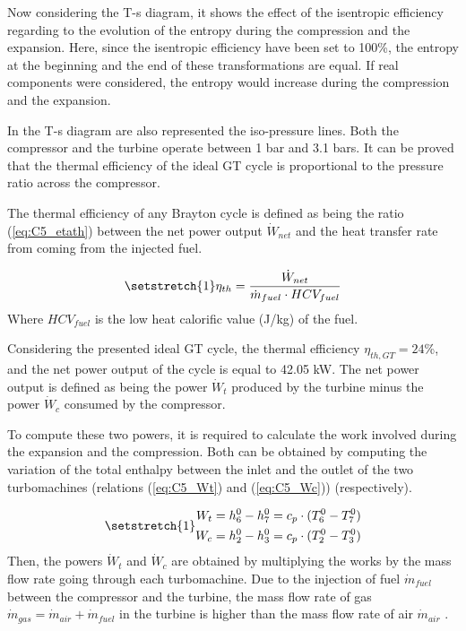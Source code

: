 Now considering the T-s diagram, it shows the effect of the isentropic efficiency regarding to the evolution of the entropy during the compression and the expansion. Here, since the isentropic efficiency have been set to 100\%, the entropy at the beginning and the end of these transformations are equal. If real components were considered, the entropy would increase during the compression and the expansion.

In the T-s diagram are also represented the iso-pressure lines. Both the compressor and the turbine operate between 1 bar and 3.1 bars. It can be  proved that the thermal efficiency of the ideal GT cycle is proportional to the pressure ratio across the compressor. 

The thermal efficiency of any Brayton cycle is defined as being the ratio (\ref{eq:C5_etath}) between the net power output $\dot{W}_{net}$ and the heat transfer rate from coming from the injected fuel.

\begin{equation}
    \setstretch{1}
    \eta_{th} = \frac{\dot{W}_{net}}{\dot{m}_{fuel}\cdot HCV_{fuel}} \label{eq:C5_etath}
\end{equation}
Where $HCV_{fuel}$ is the low heat calorific value (J/kg) of the fuel.

Considering the presented ideal GT cycle, the thermal efficiency $\eta_{th,GT} =24$\%, and the net power output of the cycle is equal to 42.05 kW. The net power output is defined as being the power $\dot{W}_t$ produced by the turbine minus the power $\dot{W}_c$ consumed by the compressor.

To compute these two powers, it is required to calculate the work involved during the expansion and the compression. Both can be obtained by computing the variation of the total enthalpy between the inlet and the outlet of the two turbomachines (relations (\ref{eq:C5_Wt}) and (\ref{eq:C5_Wc})) (respectively).

\begin{subequations}
\setstretch{1}
\begin{align}
    W_t = h^0_6 - h^0_7 = c_p\cdot(T^0_6 - T^0_7)\label{eq:C5_Wt}\\
    W_c = h^0_2 - h^0_3 = c_p\cdot(T^0_2 - T^0_3)\label{eq:C5_Wc}
\end{align}
\end{subequations}
Then, the powers $\dot{W}_t$ and $\dot{W}_c$ are obtained by multiplying the works by the mass flow rate going through each turbomachine. Due to the injection of fuel $\dot{m}_{fuel}$ between the compressor and the turbine, the mass flow rate of gas $\dot{m}_{gas}=\dot{m}_{air}+\dot{m}_{fuel}$ in the turbine is higher than the mass flow rate of air $\dot{m}_{air}$ .



